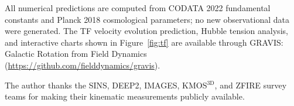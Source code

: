 \documentclass[aps,prd,preprint,superscriptaddress,showpacs,preprintnumbers,amsmath,amssymb,nofootinbib]{revtex4-2}
\begin{document}
All numerical predictions are computed from CODATA 2022 fundamental constants and Planck 2018 cosmological parameters; no new observational data were generated. The TF velocity evolution prediction, Hubble tension analysis, and interactive charts shown in Figure~\ref{fig:tf} are available through \textsc{GRAVIS}: Galactic Rotation from Field Dynamics (\url{https://github.com/fielddynamics/gravis}).

\begin{acknowledgments}
The author thanks the SINS, DEEP2, IMAGES, KMOS$^{\mathrm{3D}}$, and ZFIRE survey teams for making their kinematic measurements publicly available.
\end{acknowledgments}
\end{document}
